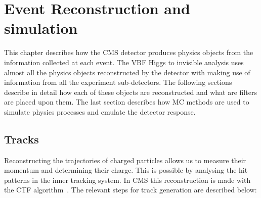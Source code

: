 \chapter{Event Reconstruction and simulation}
\label{CHAPTER:EventReconstructionAndSimulation}



This chapter describes how the \gls{CMS} detector produces physics objects from the information collected at each event. The \gls{VBF} Higgs to invisible analysis uses almost all the physics objects reconstructed by the detector with making use of information from all the experiment sub-detectors. The following sections describe in detail how each of these objects are reconstructed and what are filters are placed upon them. The last section describes how \gls{MC} methods are used to simulate physics processes and emulate the detector response.

\section{Tracks}
\label{SECTION:EventReconstructionAndSimulation_Tracks}


Reconstructing the trajectories of charged particles allows us to measure their momentum and determining their charge. This is possible by analysing the hit patterns in the inner tracking system. In \gls{CMS} this reconstruction is made with the \gls{CTF} algorithm~\cite{ARTICLE:CMSTrackReconstruction}. The relevant steps for track generation are described below:

